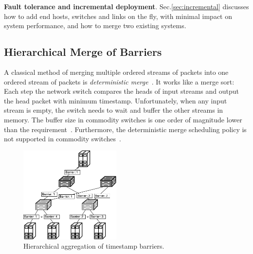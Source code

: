 \textbf{Fault tolerance and incremental deployment}.
Sec.\ref{sec:incremental} discusses how to add end hosts, switches and links on the fly, with minimal impact on system performance, and how to merge two existing \sys systems.



\subsection{Hierarchical Merge of Barriers}
\label{sec:ideal}

A classical method of merging multiple ordered streams of packets into one ordered stream of packets is \textit{deterministic merge}~\cite{hadzilacos1994modular, aguilera2000efficient}.
It works like a merge sort: Each step the network switch compares the heads of input streams and output the head packet with minimum timestamp. %
Unfortunately, when any input stream is empty, the switch needs to wait and buffer the other streams in memory.
The buffer size in commodity switches is one order of magnitude lower than the requirement~\cite{bai2017congestion}.
Furthermore, the deterministic merge scheduling policy is not supported in commodity switches~\cite{sivaraman2015towards,sivaraman2016programmable}.
                                                                     

\begin{figure}[t]
\centering
\includegraphics[width=0.45\textwidth]{images/hierarchical_merge.pdf}
\caption{Hierarchical aggregation of timestamp barriers.}
\label{fig:hierarchical_merge}
\vspace{-0.9em}
\end{figure}


